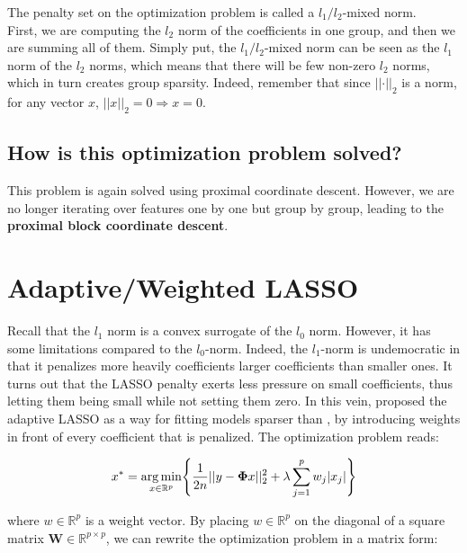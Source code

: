 \documentclass[a4paper,10pt]{article}
\theoremstyle{definition}
\begin{document}
The penalty set on the optimization problem is called a $l_1/l_2$-mixed norm. 
\\

First, we are computing the $l_2$ norm of the coefficients in one group, and then we are summing all of them. Simply put, the $l_1/l_2$-mixed norm can be seen
as the $l_1$ norm of the $l_2$ norms, which means that there will be few non-zero $l_2$ norms, which in turn creates group sparsity. Indeed, remember that since $\lvert \lvert \cdot \rvert \rvert_2$ is a norm, for any vector $x$, 
$\lvert\lvert x \rvert\rvert_2 = 0 \Rightarrow x = 0$. 

\subsection*{How is this optimization problem solved?}

This problem is again solved using proximal coordinate descent. However, we are no longer iterating over features one by one but group by group, leading to the \textbf{proximal block coordinate descent}. 

\section{Adaptive/Weighted LASSO}
\label{section_3}

Recall that the $l_1$ norm is a convex surrogate of the $l_0$ norm. However, it has some limitations compared to
the $l_0$-norm. Indeed, the $l_1$-norm is undemocratic in that it penalizes more heavily coefficients larger coefficients than smaller ones. It turns out that the LASSO penalty exerts less pressure on small coefficients,
thus letting them being small while not setting them zero. In this vein, \cite{Zou06} proposed the adaptive LASSO as a way for fitting models sparser than , by introducing weights in front of every coefficient that is 
penalized. The optimization problem reads:

\begin{equation*}
    x^* = \operatorname*{arg\,min}_{x \in \mathbb{R}^p} \Biggl\{ \frac{1}{2n} \lvert\lvert y - \mathbf{\Phi}x \rvert\rvert_2^2 + \lambda \sum_{j=1}^p w_j \lvert x_j \rvert \Biggr\}
\end{equation*}

where $w \in \mathbb{R}^p$ is a weight vector. By placing $w \in \mathbb{R}^p$ on the diagonal of a square matrix $\mathbf{W} \in \mathbb{R}^{p \times p}$, we can rewrite the optimization problem in a matrix form:
\end{document}
